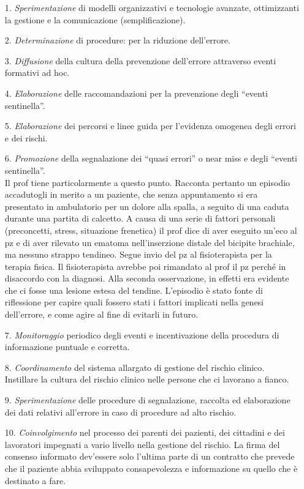 \begin{itemize}
\item[1.]
  \emph{Sperimentazione} di modelli organizzativi e tecnologie avanzate,
  ottimizzanti la gestione e la comunicazione (semplificazione).
\item[2.]
  \emph{Determinazione} di procedure: per la riduzione dell'errore.
\item[3.]
  \emph{Diffusione} della cultura della prevenzione dell'errore
  attraverso eventi formativi ad hoc.
\item[4.]
  \emph{Elaborazione} delle raccomandazioni per la prevenzione degli
  ``eventi sentinella''.
\item[5.]
  \emph{Elaborazione} dei percorsi e linee guida per l'evidenza omogenea
  degli errori e dei rischi.
\item[6.]
  \emph{Promozione} della segnalazione dei ``quasi errori'' o near miss
  e degli ``eventi sentinella''.\\
  Il prof tiene particolarmente a questo punto. Racconta pertanto un
  episodio accadutogli in merito a un paziente, che senza appuntamento
  si era presentato in ambulatorio per un dolore alla spalla, a seguito
  di una caduta durante una partita di calcetto. A causa di una serie di
  fattori personali (preconcetti, stress, situazione frenetica) il prof
  dice di aver eseguito un'eco al pz e di aver rilevato un ematoma
  nell'inserzione distale del bicipite brachiale, ma nessuno strappo
  tendineo. Segue invio del pz al fisioterapista per la terapia fisica.
  Il fisioterapista avrebbe poi rimandato al prof il pz perché in
  disaccordo con la diagnosi. Alla seconda osservazione, in effetti era
  evidente che ci fosse una lesione estesa del tendine. L'episodio è
  stato fonte di riflessione per capire quali fossero stati i fattori
  implicati nella genesi dell'errore, e come agire al fine di evitarli
  in futuro.
\item[7.]  \emph{Monitoraggio} periodico degli eventi e incentivazione della
  procedura di informazione puntuale e corretta.
\item[8.]
  \emph{Coordinamento} del sistema allargato di gestione del rischio
  clinico.\\
  Instillare la cultura del rischio clinico nelle persone che ci
  lavorano a fianco.
\item[9.]
  \emph{Sperimentazione} delle procedure di segnalazione, raccolta ed
  elaborazione dei dati relativi all'errore in caso di procedure ad alto
  rischio.
\item[10.]
  \emph{Coinvolgimento} nel processo dei parenti dei pazienti, dei
  cittadini e dei lavoratori impegnati a vario livello nella gestione
  del rischio. La firma del consenso informato dev'essere solo l'ultima
  parte di un contratto che prevede che il paziente abbia sviluppato
  consapevolezza e informazione su quello che è destinato a fare.
\end{itemize}

